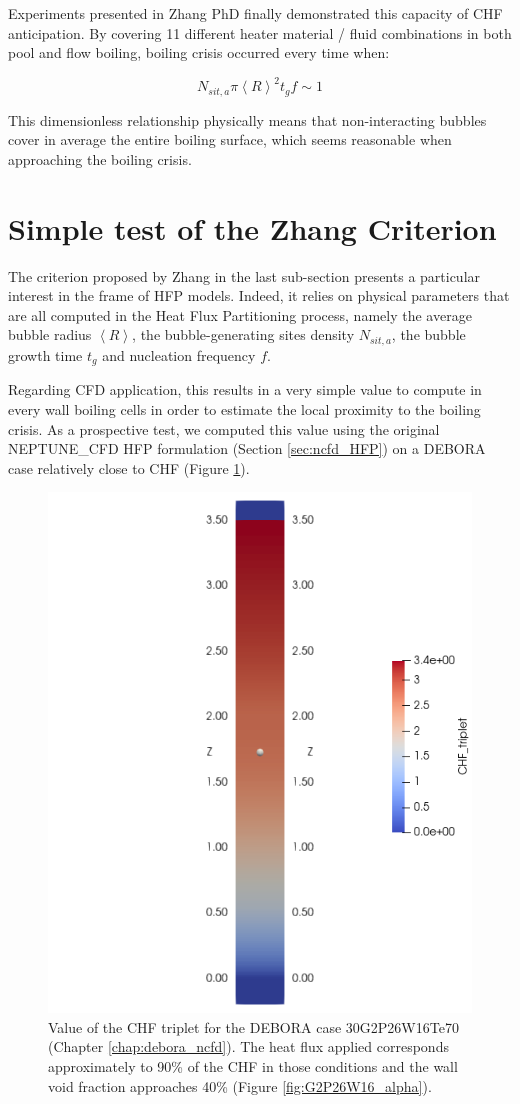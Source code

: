 \npar

Experiments presented in Zhang PhD \cite{zhang_new_2022} finally demonstrated this capacity of CHF anticipation. By covering 11 different heater material / fluid combinations in both pool and flow boiling, boiling crisis occurred every time when:

\begin{equation}
N_{sit,a} \pi \left<R\right>^{2} t_{g}f \sim 1
\label{eq:chf_zang}
\end{equation}

This dimensionless relationship physically means that non-interacting bubbles cover in average the entire boiling surface, which seems reasonable when approaching the boiling crisis.


\section{Simple test of the Zhang Criterion}
\label{sec:chf_test_debora}

The criterion proposed by Zhang in the last sub-section presents a particular interest in the frame of HFP models. Indeed, it relies on physical parameters that are all computed in the Heat Flux Partitioning process, namely the average bubble radius $\left<R\right>$, the bubble-generating sites density $N_{sit,a}$, the bubble growth time  $t_{g}$ and nucleation frequency $f$. 

\npar

Regarding CFD application, this results in a very simple value to compute in every wall boiling cells in order to estimate the local proximity to the boiling crisis. As a prospective test, we computed this value using the original NEPTUNE\_CFD HFP formulation (Section \ref{sec:ncfd_HFP}) on a DEBORA case relatively close to CHF (Figure \ref{fig:debora_chf_criterion}).


\begin{figure}[!h]
\centering
\includegraphics[width=0.45\linewidth]{img/chf/chf_crit/CHF_triplet_Te70_DEBORA.png}
\caption{Value of the CHF triplet for the DEBORA case 30G2P26W16Te70 (Chapter \ref{chap:debora_ncfd}). The heat flux applied corresponds approximately to 90\% of the CHF in those conditions \cite{falk_rapport_2002} and the wall void fraction approaches 40\% (Figure \ref{fig:G2P26W16_alpha}).}
\label{fig:debora_chf_criterion}
\end{figure}

